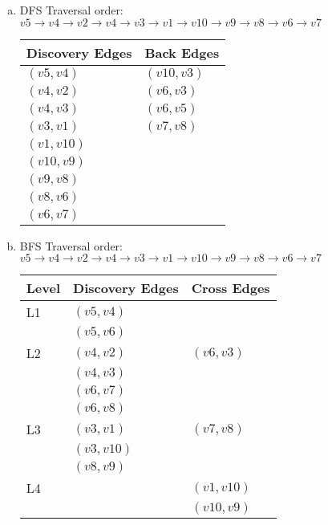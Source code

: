 \documentclass[fleqn, 12pt]{article}
\begin{document}
\begin{enumerate}[a)]
\item
    DFS Traversal order: $v5 \rightarrow v4 \rightarrow v2 \rightarrow v4 \rightarrow v3 \rightarrow v1 \rightarrow v10 \rightarrow v9 \rightarrow v8 \rightarrow v6 \rightarrow v7$
    
    \begin{center}
        \begin{tabular}{ | l | l |}
            \hline
            Discovery Edges & Back Edges \\ \hline
            $(v5,v4)$ & $(v10,v3)$ \\ \hline
            $(v4,v2)$ & $(v6,v3)$ \\ \hline
            $(v4,v3)$ & $(v6,v5)$ \\ \hline
            $(v3,v1)$ & $(v7,v8)$ \\ \hline
            $(v1,v10)$ & \\ \hline
            $(v10,v9)$ & \\ \hline
            $(v9,v8)$ & \\ \hline
            $(v8,v6)$ & \\ \hline
            $(v6,v7)$ & \\
            \hline
        \end{tabular}
    \end{center}
    
\item
    BFS Traversal order: $v5 \rightarrow v4 \rightarrow v2 \rightarrow v4 \rightarrow v3 \rightarrow v1 \rightarrow v10 \rightarrow v9 \rightarrow v8 \rightarrow v6 \rightarrow v7$
    
    \begin{center}
        \begin{tabular}{ | l | l | l | }
            \hline
            Level & Discovery Edges & Cross Edges \\ \hline
            L1 & $(v5,v4)$ & \\ \cline{2-3}
            & $(v5,v6)$ & \\ \hline
            L2 & $(v4,v2)$ & $(v6, v3)$ \\ \cline{2-3}
            & $(v4,v3)$ & \\ \cline{2-3}
            & $(v6,v7)$ & \\ \cline{2-3}
            & $(v6,v8)$ & \\ \hline
            L3 & $(v3,v1)$ & $(v7, v8)$ \\ \cline{2-3}
            & $(v3,v10)$ & \\ \cline{2-3}
            & $(v8,v9)$ & \\ \hline
            L4 & & $(v1,v10)$ \\ \cline{2-3}
            & & $(v10,v9)$ \\
            \hline
        \end{tabular}
    \end{center}
    
\end{enumerate}
\end{document}

